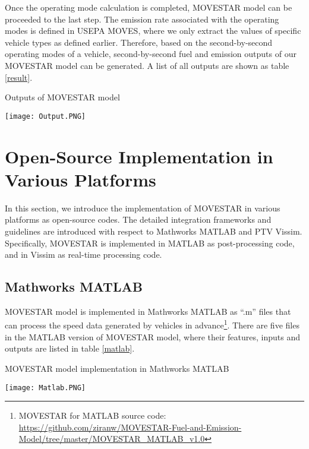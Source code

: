 \documentclass{article}
\begin{document}
    Once the operating mode calculation is completed, MOVESTAR model can be proceeded to the last step. The emission rate associated with the operating modes is defined in USEPA MOVES, where we only extract the values of specific vehicle types as defined earlier. Therefore, based on the second-by-second operating modes of a vehicle, second-by-second fuel and emission outputs of our MOVESTAR model can be generated. A list of all outputs are shown as table \ref{result}.  

    \begin{table}[ht!]
        \centering
        \caption{Outputs of MOVESTAR model}
        \texttt{[image: Output.PNG]}
        \label{result}
    \end{table}


\section{Open-Source Implementation in Various Platforms}
\label{sec:implement}
In this section, we introduce the implementation of MOVESTAR in various platforms as open-source codes. The detailed integration frameworks and guidelines are introduced with respect to Mathworks MATLAB and PTV Vissim. Specifically, MOVESTAR is implemented in MATLAB as post-processing code, and in Vissim as real-time processing code.

\subsection{Mathworks MATLAB}
MOVESTAR model is implemented in Mathworks MATLAB \cite{MATLAB} as ``.m'' files that can process the speed data generated by vehicles in advance\footnote{MOVESTAR for MATLAB source code: \href{https://github.com/ziranw/MOVESTAR-Fuel-and-Emission-Model/tree/master/MOVESTAR_MATLAB_v1.0}{https://github.com/ziranw/MOVESTAR-Fuel-and-Emission-Model/tree/master/MOVESTAR\_MATLAB\_v1.0}}. There are five files in the MATLAB version of MOVESTAR model, where their features, inputs and outputs are listed in table \ref{matlab}.

    \begin{table}[ht!]
        \centering
        \caption{MOVESTAR model implementation in Mathworks MATLAB}
        \texttt{[image: Matlab.PNG]}
        \label{matlab}
    \end{table}
    
\end{document}
